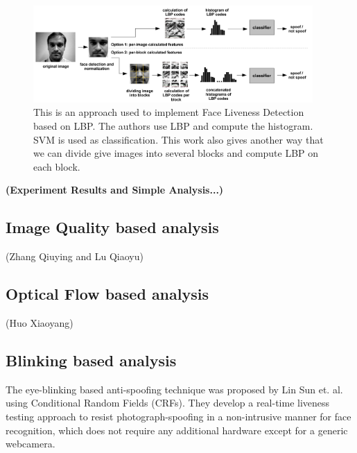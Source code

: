 \documentclass[journal]{IEEEtran}
\begin{document}
\begin{figure}[htbp]
\centering
\includegraphics[width=0.95\textwidth]{img/2-A-(1).png}
\caption{This is an approach \cite{chingovska2012effectiveness} used to implement Face Liveness Detection based on LBP. The authors use LBP and compute the histogram. SVM is used as classification. This work also gives another way that we can divide give images into several blocks and compute LBP on each block.}
\label{lbp_based_approach}
\end{figure}

\bigskip

\textbf{(Experiment Results and Simple Analysis...)}


\subsection{Image Quality based analysis}

(Zhang Qiuying and Lu Qiaoyu)

\subsection{Optical Flow based analysis}

(Huo Xiaoyang)

\subsection{Blinking based analysis}

The eye-blinking based anti-spoofing technique was proposed by Lin Sun et. al. \cite{pan2007eyeblink} using Conditional Random Fields (CRFs). They develop a real-time liveness testing approach to resist photograph-spoofing in a non-intrusive manner for face recognition, which does not require any additional hardware except for a generic webcamera.
\end{document}
